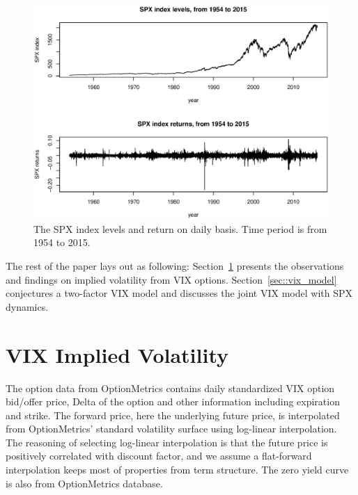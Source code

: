 \documentclass[11pt,reqno,final]{amsart}
\begin{document}
\begin{figure}[H]
  \centering
  \includegraphics[scale=0.6]{spx_index_return.eps}
  \caption{The SPX index levels and return on daily basis. Time period is from 1954 to 2015.}\label{plot_spx}
\end{figure}

The rest of the paper lays out as following: Section~\ref{sec::vix_smile} presents the observations and findings on implied volatility from VIX options. Section~\ref{sec::vix_model} conjectures a two-factor VIX model and discusses the joint VIX model with SPX dynamics.

\bigskip

\section{VIX Implied Volatility} \label{sec::vix_smile}
The option data from OptionMetrics contains daily standardized VIX option bid/offer price, Delta of the option and other information including expiration and strike. The forward price, here the underlying future price, is interpolated from OptionMetrics' standard volatility surface using log-linear interpolation. The reasoning of selecting log-linear interpolation is that the future price is positively correlated with discount factor, and we assume a flat-forward interpolation keeps most of properties from term structure. The zero yield curve is also from OptionMetrics database.
\end{document}
